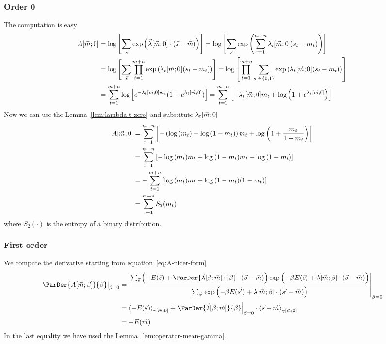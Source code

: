 \subsubsection{Order 0}
The computation is easy
\begin{align*}
  A{\left[\vec{m};0\right]}
  &= \log{\left[\sum_{\vec{s}}\exp{\left(\vec{\lambda}{\left[\vec{m};0\right]}\cdot(\vec{s}-\vec{m})\right)}\right]}
   = \log{\left[\sum_{\vec{s}}\exp{\left(\sum_{t=1}^{m+n}\lambda_t{\left[\vec{m};0\right]}(s_t-m_t)\right)}\right]}\\
  &= \log{\left[\sum_{\vec{s}}\prod_{t=1}^{m+n}\exp{\left(\lambda_t{\left[\vec{m};0\right]}(s_t-m_t)\right)}\right]}
   = \log{\left[\prod_{t=1}^{m+n}\sum_{s_t \in \{0,1\}}\exp{\left(\lambda_t{\left[\vec{m};0\right]}(s_t-m_t)\right)}\right]}\\
  &= \sum_{t=1}^{m+n}\log{\left[e^{-\lambda_t{\left[\vec{m};0\right]}m_t}(1+e^{\lambda_t{\left[\vec{m};0\right]}})\right]}
   = \sum_{t=1}^{m+n}\left[-\lambda_t{\left[\vec{m};0\right]} m_t + \log{\left(1+e^{\lambda_t{\left[\vec{m};0\right]}}\right)}\right]
\end{align*}
Now we can use the Lemma~\ref{lem:lambda-t-zero} and substitute \(\lambda_t{\left[\vec{m};0\right]}\)
\begin{align*}
  A{\left[\vec{m};0\right]}
  &= \sum_{t=1}^{m+n}\left[-\left(\log{\left(m_t\right)} - \log{\left(1-m_t\right)}\right) m_t
                + \log{\left(1+\frac{m_t}{1-m_t}\right)}\right] \\
  &= \sum_{t=1}^{m+n}\left[-\log{\left(m_t\right)}m_t + \log{\left(1-m_t\right)}m_t
                - \log{\left(1-m_t\right)}\right] \\
  &= -\sum_{t=1}^{m+n}\left[\log{\left(m_t\right)}m_t + \log{\left(1-m_t\right)}(1-m_t)\right] \\
  &= \sum_{t=1}^{m+n} S_2{(m_t)}
\end{align*}
where \(S_2{(\cdot)}\) is the entropy of a binary distribution.

\subsubsection{First order} \label{subsec:order-1-A}
We compute the derivative starting from equation~\eqref{eq:A-nicer-form}
\begin{align*}
  \left.\ParDer{A{\left[\vec{m};\beta\right]}}{\beta}\right|_{\beta=0}
  &= \left.
    \frac{
      \sums\left(-E{(\vec{s})}+\ParDer{\Lambd{\beta}{\vec{m}}}{\beta}\cdot(\vec{s}-\vec{m})\right)\GammaExp{}
    }{
      \sum_{\vec{s'}}\GammaExp{'}
    }\right|_{\beta=0}\\
  &= \Gmean{-E{(\vec{s})}}{\vec{m}}{0} +
     \left.\ParDer{\Lambd{\beta}{\vec{m}}}{\beta}\right|_{\beta=0}\cdot\Gmean{\vec{s}-\vec{m}}{\vec{m}}{0}\\
  &= -E{(\vec{m})}
\end{align*}
In the last equality we have used the Lemma~\ref{lem:operator-mean-gamma}.

